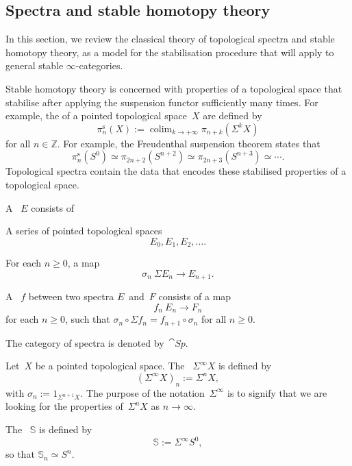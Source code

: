 \subsection{Spectra and stable homotopy theory}

In this section, we review the classical theory of
topological spectra and stable homotopy theory,
as a model for the stabilisation procedure that will
apply to general stable $\infty$-categories.

Stable homotopy theory is concerned with properties of a topological space 
that stabilise after applying the suspension functor sufficiently many times.
For example, the  of a pointed topological space~$X$
are defined by 
\[\pi_n^{\mathrm s}(X):=
\mathop{\operatorname{colim}}_{k\to+\infty} \pi_{n+k}(\Sigma^kX)\]
for all $n\in\mathbb{Z}$.
For example, the Freudenthal suspension theorem states that 
\[\pi_n^{\mathrm s}(S^0)\simeq\pi_{2n+2}(S^{n+2})
\simeq\pi_{2n+3}(S^{n+3})\simeq\cdots.\]
Topological spectra contain the data that encodes
these stabilised properties of a topological space.

\begin{definition}
    A ~$E$ consists of
    \begin{itms}
        \item A series of pointed topological spaces 
        \[E_0,E_1,E_2,\dotsc.\]
        \item For each $n\geq0$, a map 
        \[\sigma_n\:\Sigma E_n\to E_{n+1}.\]
    \end{itms}
    A ~$f$ between two spectra $E$~and~$F$
    consists of a map
    \[f_n\:E_n\to F_n\]
    for each $n\geq0$,
    such that $\sigma_n\circ\Sigma f_n=f_{n+1}\circ\sigma_n$ for all $n\geq0$.
\end{definition}

The category of spectra is denoted by~$\cat{Sp}$.

\begin{example}
    Let~$X$ be a pointed topological space.
    The ~$\Sigma^\infty X$ is defined by 
    \[ (\Sigma^\infty X)_n:=\Sigma^nX, \]
    with $\sigma_n:=1_{\Sigma^{n+1}X}$.
    The purpose of the notation~$\Sigma^\infty$ is to signify that 
    we are looking for the properties of~$\Sigma^nX$ as $n\to\infty$.

    The ~$\mathbb{S}$ is defined by
    \[ \mathbb{S}:=\Sigma^\infty S^0, \]
    so that $\mathbb{S}_n\simeq S^n$. \varqed
\end{example}

